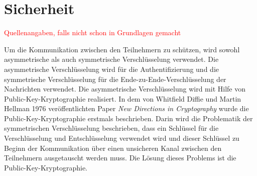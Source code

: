 \section{Sicherheit}
\label{subsec:sicherheit}




\textcolor{red}{Quellenangaben, falls nicht schon in Grundlagen gemacht}



\noindent Um die Kommunikation zwischen den Teilnehmern zu schützen, wird sowohl asymmetrische als auch symmetrische Verschlüsselung verwendet. Die asymmetrische Verschlüsselung wird für die Authentifizierung und die symmetrische Verschlüsselung für die Ende-zu-Ende-Verschlüsselung der Nachrichten verwendet. Die asymmetrische Verschlüsselung wird mit Hilfe von Public-Key-Kryptographie realisiert. In dem von Whitfield Diffie und Martin Hellman 1976 veröffentlichten Paper \textit{New Directions in Cryptography} \parencite{DiffieHellman_NewDirectionsInCryptography} wurde die Public-Key-Kryptographie erstmals beschrieben. Darin wird die Problematik der symmetrischen Verschlüsselung beschrieben, dass ein Schlüssel für die Verschlüsselung und Entschlüsselung verwendet wird und dieser Schlüssel zu Beginn der Kommunikation über einen unsicheren Kanal  zwischen den Teilnehmern ausgetauscht werden muss. Die Lösung dieses Problems ist die Public-Key-Kryptographie.

